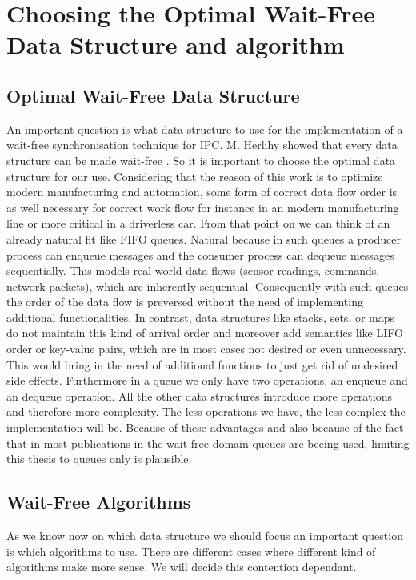 \chapter{Choosing the Optimal Wait-Free Data Structure and algorithm}\label{ch:choosing-the-optimal-wait-free-data-structure}

\section{Optimal Wait-Free Data Structure}\label{sec:optimal-wait-free-data-structure}

An important question is what data structure to use for the implementation of a wait-free synchronisation technique for \ac{IPC}. M. Herlihy showed that every data structure can be made wait-free \cite{herlihy1991wait}. So it is important to choose the optimal data structure for our use. Considering that the reason of this work is to optimize modern manufacturing and automation, some form of correct data flow order is as well necessary for correct work flow for instance in an modern manufacturing line or more critical in a driverless car. From that point on we can think of an already natural fit like \ac{FIFO} queues. Natural because in such queues a producer process can enqueue messages and the consumer process can dequeue messages sequentially. This models real-world data flows (sensor readings, commands, network packets), which are inherently sequential. Consequently with such queues the order of the data flow is preversed without the need of implementing additional functionalities. In contrast, data structures like stacks, sets, or maps do not maintain this kind of arrival order and moreover add semantics like \ac{LIFO} order or key-value pairs, which are in most cases not desired or even unnecessary. This would bring in the need of additional functions to just get rid of undesired side effects. Furthermore in a queue we only have two operations, an enqueue and an dequeue operation. All the other data structures introduce more operations and therefore more complexity. The less operations we have, the less complex the implementation will be. Because of these advantages and also because of the fact that in most publications in the wait-free domain queues are beeing used, limiting this thesis to queues only is plausible. \cite{jiffy}

\section{Wait-Free Algorithms}\label{sec:wait-free-alg}
As we know now on which data structure we should focus an important question is which algorithms to use. There are different cases where different kind of algorithms make more sense. We will decide this contention dependant.

